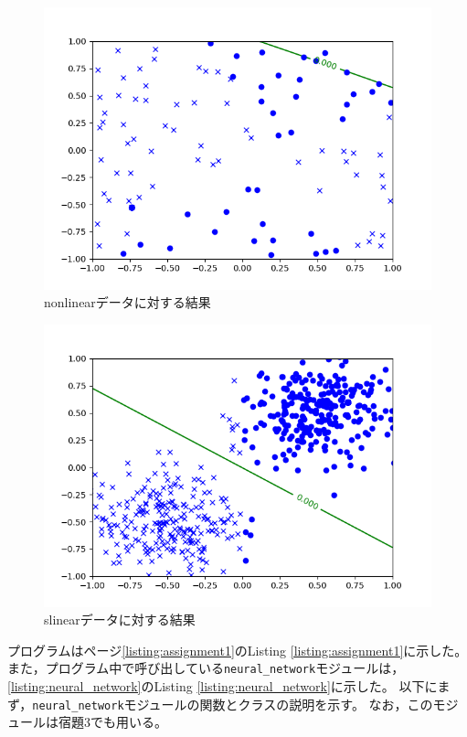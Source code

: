 \documentclass[class=jsarticle, crop=false, dvipdfmx, fleqn]{standalone}
\begin{document}
\begin{figure}[H]
    \centering
    \includegraphics[clip, width=12cm]{../figures/assignment1_1_nonlinear_result}
    \caption{nonlinearデータに対する結果}
    \label{fig:nonlinear}
\end{figure}

\begin{figure}[H]
    \centering
    \includegraphics[clip, width=12cm]{../figures/assignment1_1_slinear_result}
    \caption{slinearデータに対する結果}
    \label{fig:slinear}
\end{figure}

\clearpage

プログラムはページ\ref{listing:assignment1}のListing \ref{listing:assignment1}に示した。
また，プログラム中で呼び出している\texttt{neural\_network}モジュールは，
\ref{listing:neural_network}のListing \ref{listing:neural_network}に示した。
以下にまず，\texttt{neural\_network}モジュールの関数とクラスの説明を示す。
なお，このモジュールは宿題3でも用いる。
\end{document}
